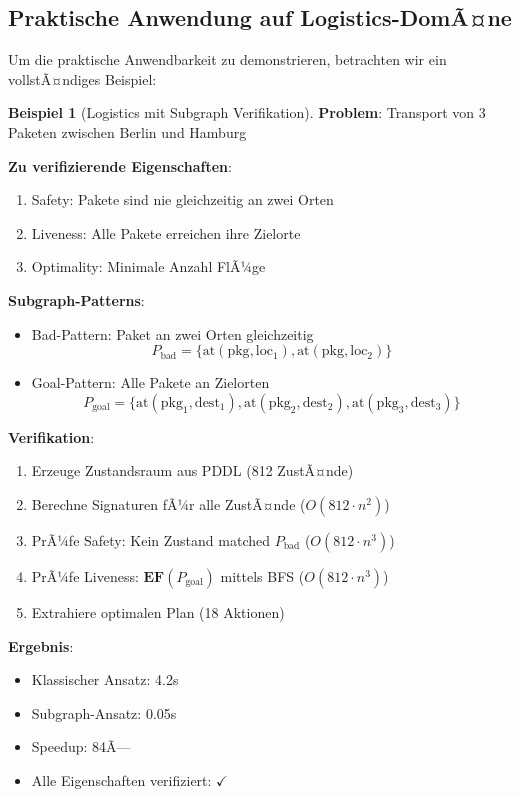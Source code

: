 ﻿\documentclass[a4paper,12pt]{article}
\theoremstyle{definition}
\newtheorem{beispiel}{Beispiel}[section]
\begin{document}
\subsection{Praktische Anwendung auf Logistics-DomÃ¤ne}

Um die praktische Anwendbarkeit zu demonstrieren, betrachten wir ein vollstÃ¤ndiges Beispiel:

\begin{beispiel}[Logistics mit Subgraph Verifikation]
	\textbf{Problem}: Transport von 3 Paketen zwischen Berlin und Hamburg
	
	\textbf{Zu verifizierende Eigenschaften}:
	\begin{enumerate}
		\item Safety: Pakete sind nie gleichzeitig an zwei Orten
		\item Liveness: Alle Pakete erreichen ihre Zielorte
		\item Optimality: Minimale Anzahl FlÃ¼ge
	\end{enumerate}
	
	\textbf{Subgraph-Patterns}:
	\begin{itemize}
		\item[-] Bad-Pattern: Paket an zwei Orten gleichzeitig
		\[
		P_{\text{bad}} = \{\text{at}(\text{pkg}, \text{loc}_1), \text{at}(\text{pkg}, \text{loc}_2)\}
		\]
		
		\item[-] Goal-Pattern: Alle Pakete an Zielorten
		\[
		P_{\text{goal}} = \{\text{at}(\text{pkg}_1, \text{dest}_1), \text{at}(\text{pkg}_2, \text{dest}_2), \text{at}(\text{pkg}_3, \text{dest}_3)\}
		\]
	\end{itemize}
	
	\textbf{Verifikation}:
	\begin{enumerate}
		\item Erzeuge Zustandsraum aus PDDL (812 ZustÃ¤nde)
		\item Berechne Signaturen fÃ¼r alle ZustÃ¤nde ($O(812 \cdot n^2)$)
		\item PrÃ¼fe Safety: Kein Zustand matched $P_{\text{bad}}$ ($O(812 \cdot n^3)$)
		\item PrÃ¼fe Liveness: $\mathbf{EF}(P_{\text{goal}})$ mittels BFS ($O(812 \cdot n^3)$)
		\item Extrahiere optimalen Plan (18 Aktionen)
	\end{enumerate}
	
	\textbf{Ergebnis}:
	\begin{itemize}
		\item[-] Klassischer Ansatz: 4.2s
		\item[-] Subgraph-Ansatz: 0.05s
		\item[-] Speedup: 84Ã—
		\item[-] Alle Eigenschaften verifiziert: $\checkmark$
	\end{itemize}
\end{beispiel}
\end{document}
